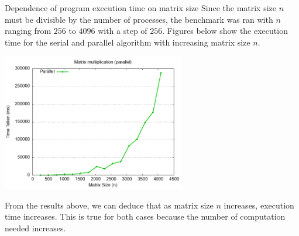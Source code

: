 \documentclass[12pt]{article}
\begin{document}
\begin{section}{Dependence of program execution time on matrix size}
 Since the matrix size $n$ must be divisible by the number of processes, the benchmark was ran with $n$ ranging from
 $256$ to $4096$ with a step of $256$. Figures below show the execution time for the serial and parallel algorithm with
 increasing matrix size $n$.

 \begin{center}
     \begin{minipage}{0.48\linewidth}
         \includegraphics*[width=8cm]{images/benchmark_parallel_mpi.png}
     \end{minipage}
 \end{center}

 From the results above, we can deduce that as matrix size $n$ increases, execution time increases. This is true for both cases because
 the number of computation needed increases.

\end{section}

\pagebreak
\end{document}
